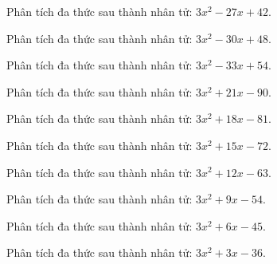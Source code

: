 \begin{bt}
	Phân tích đa thức sau thành nhân tử: $3 x^2 - 27 x + 42$.
\end{bt}
\begin{bt}
	Phân tích đa thức sau thành nhân tử: $3 x^2 - 30 x + 48$.
\end{bt}
\begin{bt}
	Phân tích đa thức sau thành nhân tử: $3 x^2 - 33 x + 54$.
\end{bt}
\begin{bt}
	Phân tích đa thức sau thành nhân tử: $3 x^2 + 21 x - 90$.
\end{bt}
\begin{bt}
	Phân tích đa thức sau thành nhân tử: $3 x^2 + 18 x - 81$.
\end{bt}
\begin{bt}
	Phân tích đa thức sau thành nhân tử: $3 x^2 + 15 x - 72$.
\end{bt}
\begin{bt}
	Phân tích đa thức sau thành nhân tử: $3 x^2 + 12 x - 63$.
\end{bt}
\begin{bt}
	Phân tích đa thức sau thành nhân tử: $3 x^2 + 9 x - 54$.
\end{bt}
\begin{bt}
	Phân tích đa thức sau thành nhân tử: $3 x^2 + 6 x - 45$.
\end{bt}
\begin{bt}
	Phân tích đa thức sau thành nhân tử: $3 x^2 + 3 x - 36$.
\end{bt}
